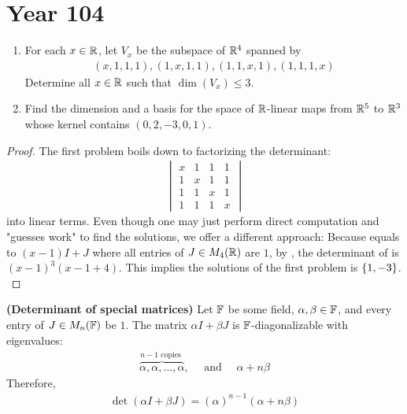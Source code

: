 \documentclass{report}
\begin{document}
\section{Year 104}
\begin{question}{}{}
\begin{enumerate}[label=(\roman*)]
  \item For each $x\in\mathbb{R}$, let $V_x$ be the subspace of  $\mathbb{R}^4$ spanned by 
   \begin{align*}
      (x,1,1,1),(1,x,1,1),(1,1,x,1),(1,1,1,x)
  \end{align*}
  Determine all $x\in\mathbb{R}$ such that $\operatorname{dim}(V_x)\leq 3$. 
  \item Find the dimension and a basis for the space of $\mathbb{R}$-linear maps from $\mathbb{R}^5$ to $\mathbb{R}^3$ whose kernel contains  $(0,2,-3,0,1)$. 
\end{enumerate}
\end{question}
\begin{proof}
The first problem boils down to factorizing the determinant:
\begin{align}
\label{xma}
\begin{vmatrix}
  x& 1 & 1 & 1 \\
  1 & x & 1 & 1\\
  1 & 1 & x & 1 \\
  1 & 1 & 1 & x
\end{vmatrix}
\end{align}
into linear terms. Even though one may just perform direct computation and "guesses work" to find the solutions, we offer a different approach: Because  equals to $(x-1)I+ J$ where all entries of $J \in M_4(\mathbb{R})$ are $1$, by , the determinant of  is  $(x-1)^3(x-1+4)$. This implies the solutions of the first problem is $\{ 1,-3 \}$. \\




\end{proof}
\begin{theorem}
\label{Dosm}
\textbf{(Determinant of special matrices)} Let $\mathbb{F}$ be some field, $\alpha ,\beta  \in\mathbb{F}$, and every entry of $J\in M_n(\mathbb{F})$ be $1$.  The matrix  $\alpha I+\beta J$ is $\mathbb{F}$-diagonalizable with eigenvalues: 
\begin{align}
\label{alovb}
\overbrace{\alpha ,\alpha ,\dots ,\alpha  }^{n-1\text{ copies }},\quad \text{ and }\quad \alpha +n \beta 
\end{align}
Therefore, 
\begin{align}
\label{dea}
\operatorname{det}(\alpha I+\beta J)= (\alpha)^{n-1}(\alpha +n \beta )
\end{align}
\end{theorem}
\end{document}
